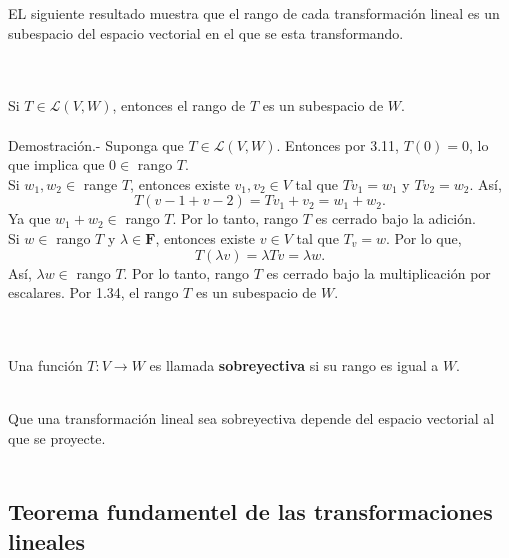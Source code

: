 EL siguiente resultado muestra que el rango de cada transformación lineal es un subespacio del espacio vectorial en el que se esta transformando.

\setcounter{myteo}{18}
\begin{myteo}\,\\\\
    Si $T\in \mathcal{L}(V,W)$, entonces el rango de $T$ es un subespacio de $W$.\\\\
	Demostración.-\; Suponga que $T\in \mathcal{L}(V,W)$. Entonces por 3.11, $T(0)=0$, lo que implica que $0\in$ rango $T$.\\
	Si $w_1,w_2\in$ range $T$, entonces existe $v_1,v_2\in V$ tal que $Tv_1=w_1$ y $Tv_2=w_2$. Así,
	$$T(v-1+v-2)=Tv_1+v_2=w_1+w_2.$$
	Ya que $w_1+w_2\in$ rango $T$. Por lo tanto, rango $T$ es cerrado bajo la adición.\\
	Si $w\in$ rango $T$ y $\lambda\in \textbf{F}$, entonces existe $v\in V$ tal que $T_v=w$.
	Por lo que, 
	$$T(\lambda v)=\lambda Tv=\lambda w.$$
	Así, $\lambda w\in$ rango $T$. Por lo tanto, rango $T$ es cerrado bajo la multiplicación por escalares. Por 1.34, el rango $T$ es un subespacio de $W$.
\end{myteo}

\begin{mydef}[Sobreyectiva]\,\\\\
	Una función $T:V\to W$ es llamada \textbf{sobreyectiva} si su rango es igual a $W$.\\\\
\end{mydef}

Que una transformación lineal sea sobreyectiva depende del espacio vectorial al que se proyecte.\\\\


\subsection*{Teorema fundamentel de las transformaciones lineales}


